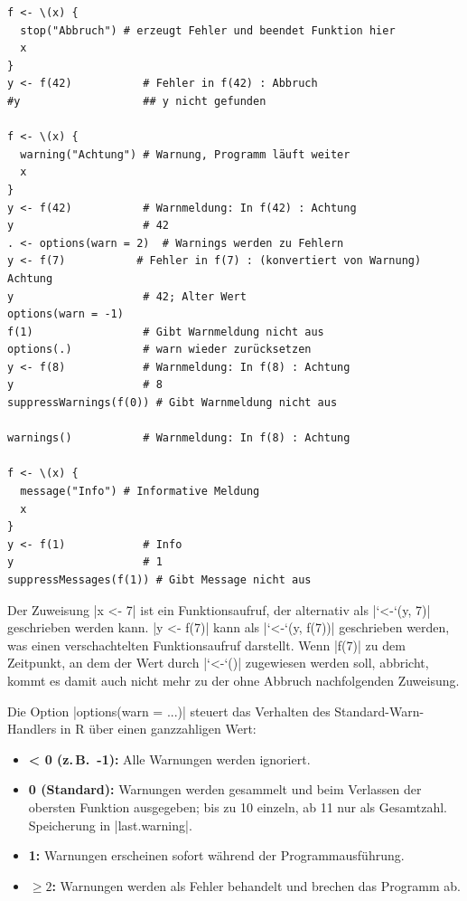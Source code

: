\documentclass[10pt,twocolumn]{scrartcl}
\renewcommand{\lstinline}{\mycoloredinline}
\begin{document}
\begin{lstlisting}
f <- \(x) {
  stop("Abbruch") # erzeugt Fehler und beendet Funktion hier
  x
}
y <- f(42)           # Fehler in f(42) : Abbruch
#y                   ## y nicht gefunden

f <- \(x) {
  warning("Achtung") # Warnung, Programm läuft weiter
  x
}
y <- f(42)           # Warnmeldung: In f(42) : Achtung
y                    # 42
. <- options(warn = 2)  # Warnings werden zu Fehlern
y <- f(7)           # Fehler in f(7) : (konvertiert von Warnung) Achtung
y                    # 42; Alter Wert
options(warn = -1)
f(1)                 # Gibt Warnmeldung nicht aus
options(.)           # warn wieder zurücksetzen
y <- f(8)            # Warnmeldung: In f(8) : Achtung
y                    # 8
suppressWarnings(f(0)) # Gibt Warnmeldung nicht aus

warnings()           # Warnmeldung: In f(8) : Achtung

f <- \(x) {
  message("Info") # Informative Meldung
  x
}
y <- f(1)            # Info
y                    # 1
suppressMessages(f(1)) # Gibt Message nicht aus

\end{lstlisting}

Der Zuweisung \lstinline|x <- 7| ist ein Funktionsaufruf, der alternativ als \lstinline|`<-`(y, 7)| geschrieben werden kann. \lstinline|y <- f(7)| kann als \lstinline|`<-`(y, f(7))| geschrieben werden, was einen verschachtelten Funktionsaufruf darstellt.  Wenn \lstinline|f(7)| zu dem Zeitpunkt, an dem der Wert durch \lstinline|`<-`()| zugewiesen werden soll, abbricht, kommt es damit auch nicht mehr zu der ohne Abbruch nachfolgenden Zuweisung.

Die Option \lstinline|options(warn = ...)| steuert das Verhalten des Standard-Warn-Handlers in R über einen ganzzahligen Wert:

\begin{itemize}
  \item \textbf{< 0 (z.\,B.\ -1):} Alle Warnungen werden ignoriert.
  \item \textbf{0 (Standard):} Warnungen werden gesammelt und beim Verlassen der obersten Funktion ausgegeben; bis zu 10 einzeln, ab 11 nur als Gesamtzahl. Speicherung in \lstinline|last.warning|.
  \item \textbf{1:} Warnungen erscheinen sofort während der Programmausführung.
  \item \textbf{$\geq 2$:} Warnungen werden als Fehler behandelt und brechen das Programm ab.
\end{itemize}
\end{document}
